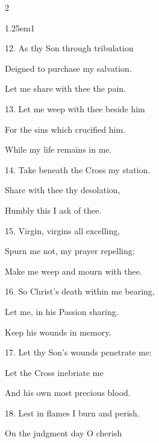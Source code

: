 \begin{multicols}{2}
\begin{hangparas}{1.25em}{1}
\vspace{-0.5\baselineskip}

12. As thy Son through tribulation

Deigned to purchase my salvation.

Let me share with thee the pain.\\

\vspace{-0.5\baselineskip}

13. Let me weep with thee beside him

For the sins which crucified him.

While my life remains in me.\\

\vspace{-0.5\baselineskip}

14. Take beneath the Cross my station.

Share with thee thy desolation,

Humbly this I ask of thee.\\

\vspace{-0.5\baselineskip}

15. Virgin, virgins all excelling,

Spurn me not, my prayer repelling;

Make me weep and mourn with thee.\\

\vspace{-0.5\baselineskip}

16. So Christ's death within me bearing,

Let me, in his Passion sharing.

Keep his wounds in memory.\\

\vspace{-0.5\baselineskip}

17. Let thy Son's wounds penetrate me:

Let the Cross inebriate me

And his own most precious blood.\\

\vspace{-0.5\baselineskip}

18. Lest in flames I burn and perish.

On the judgment day O cherish


\end{hangparas}
\end{multicols}
